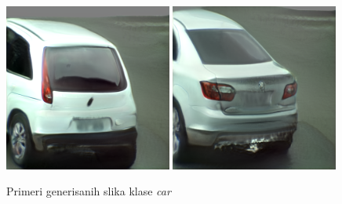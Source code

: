 \documentclass[12pt,oneside]{memoir}
\begin{document}
\begin{figure}[!htbp]
\centering
    \includegraphics[width=0.49\textwidth]{matfmaster/stylegan/car/image1.png}  \includegraphics[width=0.49\textwidth]{matfmaster/stylegan/car/image2.png}
\caption{Primeri generisanih slika klase \textit{car}}
\label{fig:section4_stylegan_car_images}
\end{figure}
\end{document}
